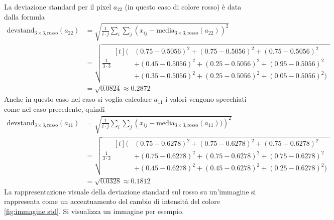 La deviazione standard per il pixel $a_{22}$ (in questo caso di colore rosso) è data dalla formula
\begin{align}
\mathrm{devstand}_{3\times3,\mathrm{rosso}}(a_{22})
&=\sqrt{\frac{1}{i\cdot j} \sum_{i}\sum_{j}  \left( x_{ij}-\mathrm{media}_{3\times3,\mathrm{rosso}}(a_{22}) \right)^2}\\
&=
\sqrt{
    \frac{1}{3\cdot3}
    \begin{aligned}[t]
    \Big(
        &(0.75-0.5056)^2+(0.75-0.5056)^2+(0.75-0.5056)^2 \\
        &+(0.45-0.5056)^2+(0.25-0.5056)^2+(0.95-0.5056)^2 \\
        &+(0.35-0.5056)^2+(0.25-0.5056)^2+(0.05-0.5056)^2
    \Big)
    \end{aligned}
} \\
&= \sqrt{0.0824} \approx 0.2872
\end{align}
Anche in questo caso nel caso si voglia calcolare 
$a_{11}$ i valori vengono specchiati come 
nel caso precedente, quindi
\begin{align}
\mathrm{devstand}_{3\times3,\mathrm{rosso}}(a_{11})
&=\sqrt{\frac{1}{i\cdot j} \sum_{i}\sum_{j}  \left( x_{ij}-\mathrm{media}_{3\times3,\mathrm{rosso}}(a_{11})) \right)^2}\\
&=
\sqrt{
    \frac{1}{3\cdot3}
    \begin{aligned}[t]
    \Big(
        &(0.75-0.6278)^2+(0.75-0.6278)^2+(0.75-0.6278)^2 \\
        &+(0.75-0.6278)^2+(0.75-0.6278)^2+(0.75-0.6278)^2 \\
        &+(0.45-0.6278)^2+(0.45-0.6278)^2+(0.25-0.6278)^2 \Big)
    \end{aligned}
} \\
&= \sqrt{0.0328} \approx 0.1812
\end{align}
La rappresentazione visuale della deviazione standard sul rosso su un'immagine si rappresenta come un 
accentuamento del cambio di intensità del colore \ref{fig:immagine std}. Si visualizza un immagine per esempio.

